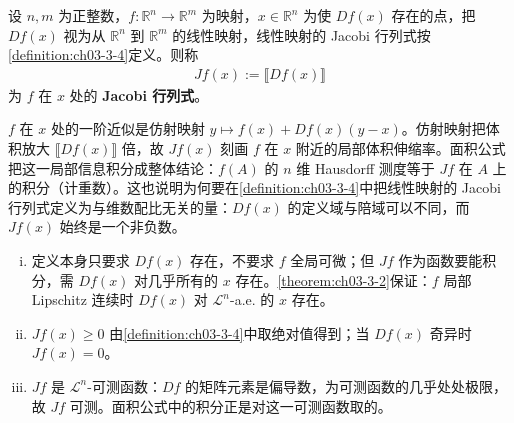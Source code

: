 \documentclass[../../main.tex]{subfiles}%
\begin{document}
\begin{definition}\label{definition:ch03-3-6}
设 $n,m$ 为正整数，$f:\mathbb{R}^n\to\mathbb{R}^m$ 为映射，$x\in\mathbb{R}^n$ 为使 $Df(x)$ 存在的点，把 $Df(x)$ 视为从 $\mathbb{R}^n$ 到 $\mathbb{R}^m$ 的线性映射，线性映射的 Jacobi 行列式按\cref{definition:ch03-3-4}定义。则称%
\begin{align*}
Jf(x):=\llbracket Df(x)\rrbracket
\end{align*}
为 $f$ 在 $x$ 处的 \textbf{Jacobi 行列式}。
\end{definition}

\begin{remark}\label{remark:ch03-def-3-6-动机}
$f$ 在 $x$ 处的一阶近似是仿射映射 $y\mapsto f(x)+Df(x)(y-x)$。仿射映射把体积放大 $\llbracket Df(x)\rrbracket$ 倍，故 $Jf(x)$ 刻画 $f$ 在 $x$ 附近的局部体积伸缩率。面积公式把这一局部信息积分成整体结论：$f(A)$ 的 $n$ 维 Hausdorff 测度等于 $Jf$ 在 $A$ 上的积分（计重数）。这也说明为何要在\cref{definition:ch03-3-4}中把线性映射的 Jacobi 行列式定义为与维数配比无关的量：$Df(x)$ 的定义域与陪域可以不同，而 $Jf(x)$ 始终是一个非负数。%
\end{remark}

\begin{remark}\label{remark:ch03-def-3-6-条件}
\begin{enumerate}[(i)]
\item 定义本身只要求 $Df(x)$ 存在，不要求 $f$ 全局可微；但 $Jf$ 作为函数要能积分，需 $Df(x)$ 对几乎所有的 $x$ 存在。\cref{theorem:ch03-3-2}保证：$f$ 局部 Lipschitz 连续时 $Df(x)$ 对 $\mathcal{L}^n$-a.e. 的 $x$ 存在。%
\item $Jf(x)\geqslant0$ 由\cref{definition:ch03-3-4}中取绝对值得到；当 $Df(x)$ 奇异时 $Jf(x)=0$。%
\item $Jf$ 是 $\mathcal{L}^n$-可测函数：$Df$ 的矩阵元素是偏导数，为可测函数的几乎处处极限，故 $Jf$ 可测。面积公式中的积分正是对这一可测函数取的。%
\end{enumerate}
\end{remark}
\end{document}
